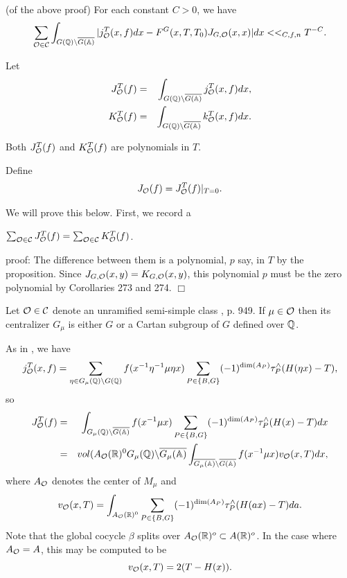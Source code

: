 \begin{corollary}
(of the above proof) For each constant $C>0$, we have 
\[
\sum_{{\cal{O}}\in {\cal{C}}}
\int_{G({\Bbb{Q}})\backslash \overline{G(\Bbb{A})}}
|j_{{\cal{O}}}^T(x,f)dx-F^G(x,T,T_0)J_{G,{\cal{O}}}(x,x)|dx
<<_{C,f,n}T^{-C}. 
\]
\end{corollary}

Let 
\begin{eqnarray*}
J_{{\cal{O}}}^T(f) &=&
\int_{G({\Bbb{Q}})\backslash \overline{G({\Bbb{A}})}}
j_{{\cal{O}}}^T(x,f)dx, \\
K_{{\cal{O}}}^T(f)
&=&\int_{G({\Bbb{Q}})\backslash \overline{G({\Bbb{A}})}}
k_{{\cal{O}}}^T(x,f)dx.
\end{eqnarray*}

\begin{proposition}
Both $
J_{{\cal{O}}}^T(f)
$ and $K_{{\cal{O}}}^T(f)$ are polynomials in
$T$.
\end{proposition}

Define
\begin{equation}
J_{{\cal{O}}}(f)
=J_{{\cal{O}}}^T(f)|_{T=0}.
\end{equation}

We will prove this below. First, we record a

\begin{corollary}
$\sum_{{\cal{O}}\in {\cal{C}}}J_{{\cal{O}}}^T(f)=\sum_{{\cal{O}}\in 
{\cal{C}}}K_{{\cal{O}}}^T(f)$.
\end{corollary}

proof: The difference between them is a polynomial, $p$ say, in $T$ by the
proposition. Since $J_{G,{\cal{O}}}(x,y)=K_{G,{\cal{O}}}(x,y)$, this
polynomial $p$ must be the zero polynomial by Corollaries 273 
and 274. $\Box $

Let ${\cal{O}}\in {\cal{C}}$ denote an unramified semi-simple class
\cite{A2}, p. 949.
If $\mu \in {\cal{O}}$ then its centralizer $G_\mu $ is either $G$
or a Cartan subgroup of $G$ defined over ${\Bbb{Q}}$.

As in \cite{A2}, we have 
\begin{equation}
j_{{\cal{O}}}^T(x,f)=
\sum_{\eta \in G_\mu ({\Bbb{Q}})\backslash G({\Bbb{Q}})}
f(x^{-1}\eta ^{-1}\mu \eta x)\sum_{P\in \{B,G\}}(-1)^{\dim (A_P)}
\tau_P^{\wedge }(H(\eta x)-T),
\end{equation}
so 
\begin{eqnarray}
J_{{\cal{O}}}^T(f)
&=&\int_{G_\mu ({\Bbb{Q}})\backslash \overline{G({\Bbb{A}})}}
f(x^{-1}\mu x)\sum_{P\in \{B,G\}}(-1)^{\dim (A_P)}
\tau _P^{\wedge}(H(x)-T)dx \\
&=&vol(A_{{\cal{O}}}({\Bbb{R}})^0G_\mu ({\Bbb{Q}})
\backslash \overline{G_\mu ({\Bbb{A}})}
\int_{\overline{G_\mu ({\Bbb{A}})}\backslash \overline{G({\Bbb{A}})}}
f(x^{-1}\mu x)v_{{\cal{O}}}(x,T)dx,  \nonumber
\end{eqnarray}
where $A_{{\cal{O}}}$ denotes the center of $M_\mu $ and 
\[
v_{{\cal{O}}}(x,T)
=\int_{A_{{\cal{O}}}({\Bbb{R}})^0}\sum_{P\in
\{B,G\}}(-1)^{\dim (A_P)}\tau _P^{\wedge }(H(ax)-T)da. 
\]
Note that the global cocycle $\beta $ splits over
$A_{{\cal{O}}}({\Bbb{R}})^o\subset A({\Bbb{R}})^o$.
In the case where $A_{\cal{O}}=A$, this may be
computed to be 
\[
v_{{\cal{O}}}(x,T)=2(T-H(x)). 
\]

